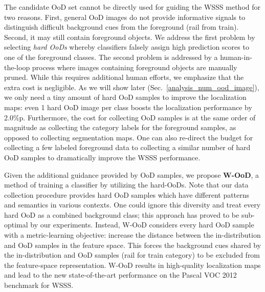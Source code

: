 \documentclass[10pt,twocolumn,letterpaper]{article}
\begin{document}
The candidate OoD set cannot be directly used for guiding the WSSS method for two reasons. First, general OoD images do not provide informative signals to distinguish difficult background cues from the foreground (\eg rail from train). Second, it may still contain foreground objects. 
We address the first problem by selecting \textit{hard OoDs} whereby classifiers falsely assign high prediction scores to one of the foreground classes.
The second problem is addressed by a human-in-the-loop process where images containing foreground objects are manually pruned. While this requires additional human efforts, we emphasize that the extra cost is negligible. As we will show later (Sec.~\ref{analysis_num_ood_image}), we only need a tiny amount of hard OoD samples to improve the localization maps: even 1 hard OoD image per class boosts the localization performance by 2.0\%p. 
Furthermore, the cost for collecting OoD samples is at the same order of magnitude as collecting the category labels for the foreground samples, as opposed to collecting \eg segmentation maps. 
One can also re-direct the budget for collecting a few labeled foreground data to collecting a similar number of hard OoD samples to dramatically improve the WSSS performance.









Given the additional guidance provided by OoD samples, we propose \textbf{W-OoD}, a method of training a classifier by utilizing the hard-OoDs. 
Note that our data collection procedure provides hard OoD samples which have different patterns and semantics in various contexts.
One could ignore this diversity and treat every hard OoD as a combined background class; this approach has proved to be sub-optimal by our experiments.
Instead, W-OoD considers every hard OoD sample with a metric-learning objective: increase the distance between the in-distribution and OoD samples in the feature space.
This forces the background cues shared by the in-distribution and OoD samples (\eg rail for train category) to be excluded from the feature-space representation. 
W-OoD results in high-quality localization maps and lead to the new state-of-the-art performance on the Pascal VOC 2012 benchmark for WSSS.
\end{document}
